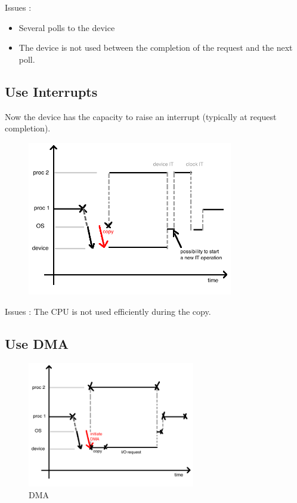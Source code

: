 Issues :

\begin{itemize}
  \item Several polls to the device
  \item The device is not used between the completion of the request and the next poll.
\end{itemize}

\subsection{Use Interrupts}

Now the device has the capacity to raise an interrupt (typically at request completion).

\begin{figure}[h!]
  \begin{center}
    \includegraphics[width=0.8\textwidth]{interrupt.png}
    \label{fig:io4}
  \end{center}
\end{figure}

Issues : The CPU is not used efficiently during the copy.

\subsection{Use DMA}

\begin{figure}[h!]
  \begin{center}
    \includegraphics[width=0.65\textwidth]{dma.png}
    \caption{DMA}
    \label{fig:io5}
  \end{center}
\end{figure}

